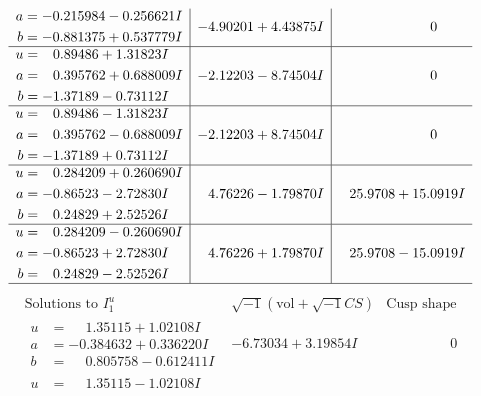 \documentclass[1p]{elsarticle_modified}
\theoremstyle{definition}
\newcommand{\I}{\sqrt{-1}}
\begin{document}
$$\begin{array}{c|c|c}
\begin{aligned}
a &= -0.215984 - 0.256621 I \\
b &= -0.881375 + 0.537779 I\end{aligned}
 & -4.90201 + 4.43875 I & \phantom{-0.000000 } 0 \\ \hline\begin{aligned}
u &= \phantom{-}0.89486 + 1.31823 I \\
a &= \phantom{-}0.395762 + 0.688009 I \\
b &= -1.37189 - 0.73112 I\end{aligned}
 & -2.12203 - 8.74504 I & \phantom{-0.000000 } 0 \\ \hline\begin{aligned}
u &= \phantom{-}0.89486 - 1.31823 I \\
a &= \phantom{-}0.395762 - 0.688009 I \\
b &= -1.37189 + 0.73112 I\end{aligned}
 & -2.12203 + 8.74504 I & \phantom{-0.000000 } 0 \\ \hline\begin{aligned}
u &= \phantom{-}0.284209 + 0.260690 I \\
a &= -0.86523 - 2.72830 I \\
b &= \phantom{-}0.24829 + 2.52526 I\end{aligned}
 & \phantom{-}4.76226 - 1.79870 I & \phantom{-}25.9708 + 15.0919 I \\ \hline\begin{aligned}
u &= \phantom{-}0.284209 - 0.260690 I \\
a &= -0.86523 + 2.72830 I \\
b &= \phantom{-}0.24829 - 2.52526 I\end{aligned}
 & \phantom{-}4.76226 + 1.79870 I & \phantom{-}25.9708 - 15.0919 I\\
 \hline 
 \end{array}$$\newpage$$\begin{array}{c|c|c}  
\text{Solutions to }I^u_{1}& \I (\text{vol} + \sqrt{-1}CS) & \text{Cusp shape}\\
 \hline 
\begin{aligned}
u &= \phantom{-}1.35115 + 1.02108 I \\
a &= -0.384632 + 0.336220 I \\
b &= \phantom{-}0.805758 - 0.612411 I\end{aligned}
 & -6.73034 + 3.19854 I & \phantom{-0.000000 } 0 \\ \hline\begin{aligned}
u &= \phantom{-}1.35115 - 1.02108 I \\

\end{aligned}
\end{array}$$
\end{document}
